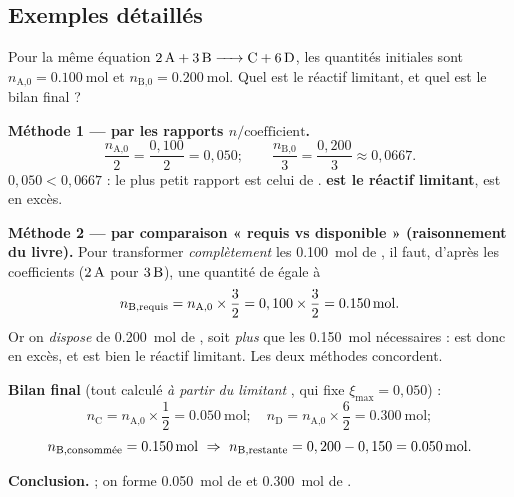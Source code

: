 \documentclass[11pt,a4paper]{article}
\newcommand{\nq}[1]{n_{\text{#1}}}        %
\begin{document}
\subsection{Exemples détaillés}

\begin{exemple}
Pour la même équation $\ce{2A + 3B -> C + 6D}$, les quantités initiales sont
$\nq{A,0}=\SI{0,100}{\mole}$ et $\nq{B,0}=\SI{0,200}{\mole}$. Quel est le réactif limitant, et quel
est le bilan final ?

\smallskip
\textbf{Méthode 1 — par les rapports $n/\text{coefficient}$.}
\[
\frac{\nq{A,0}}{2}=\frac{0,100}{2}=0,050 ;\qquad \frac{\nq{B,0}}{3}=\frac{0,200}{3}\approx0,0667 .
\]
$0,050<0,0667$ : le plus petit rapport est celui de . \textbf{ est le réactif
limitant},  est en excès.

\textbf{Méthode 2 — par comparaison « requis vs disponible » (raisonnement du livre).} Pour
transformer \emph{complètement} les \SI{0,100}{\mole} de , il faut, d'après les coefficients
($2\,\ce{A}$ pour $3\,\ce{B}$), une quantité de  égale à
\[
\nq{B,\text{requis}}=\nq{A,0}\times\frac{3}{2}=0,100\times\frac{3}{2}=\SI{0,150}{\mole}.
\]
Or on \emph{dispose} de \SI{0,200}{\mole} de , soit \emph{plus} que les \SI{0,150}{\mole}
nécessaires :  est donc en excès, et  est bien le réactif limitant. Les deux méthodes
concordent.

\textbf{Bilan final} (tout calculé \emph{à partir du limitant} , qui fixe $\xi_{\max}=0,050$) :
\[
\nq{C}=\nq{A,0}\times\frac{1}{2}=\SI{0,050}{\mole};\quad
\nq{D}=\nq{A,0}\times\frac{6}{2}=\SI{0,300}{\mole};
\]
\[
\nq{B,\text{consommée}}=\SI{0,150}{\mole}\ \Rightarrow\ \nq{B,\text{restante}}=0,200-0,150=\SI{0,050}{\mole}.
\]

\textbf{Conclusion.}  ; on forme
\SI{0,050}{\mole} de  et \SI{0,300}{\mole} de .


\end{exemple}
\end{document}
